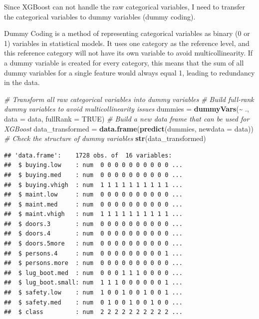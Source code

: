 \documentclass[
]{article}
\newenvironment{Shaded}{\begin{snugshade}}{\end{snugshade}}
\newcommand{\AttributeTok}[1]{\textcolor[rgb]{0.13,0.29,0.53}{#1}}
\newcommand{\CommentTok}[1]{\textcolor[rgb]{0.56,0.35,0.01}{\textit{#1}}}
\newcommand{\ConstantTok}[1]{\textcolor[rgb]{0.56,0.35,0.01}{#1}}
\newcommand{\FunctionTok}[1]{\textcolor[rgb]{0.13,0.29,0.53}{\textbf{#1}}}
\newcommand{\NormalTok}[1]{#1}
\newcommand{\OtherTok}[1]{\textcolor[rgb]{0.56,0.35,0.01}{#1}}
\newcommand{\SpecialCharTok}[1]{\textcolor[rgb]{0.81,0.36,0.00}{\textbf{#1}}}
\begin{document}
Since XGBoost can not handle the raw categorical variables, I need to
transfer the categorical variables to dummy variables (dummy coding).

Dummy Coding is a method of representing categorical variables as binary
(0 or 1) variables in statistical models. It uses one category as the
reference level, and this reference category will not have its own
variable to avoid multicollinearity. If a dummy variable is created for
every category, this means that the sum of all dummy variables for a
single feature would always equal 1, leading to redundancy in the data.

\begin{Shaded}
\begin{Highlighting}[]
\CommentTok{\# Transform all raw categorical variables into dummy variables}
\CommentTok{\# Build full{-}rank dummy variables to avoid multicollinearity issues}
\NormalTok{dummies }\OtherTok{=} \FunctionTok{dummyVars}\NormalTok{(}\SpecialCharTok{\textasciitilde{}}\NormalTok{ ., }\AttributeTok{data =}\NormalTok{ data, }\AttributeTok{fullRank =} \ConstantTok{TRUE}\NormalTok{)}
\CommentTok{\# Build a new data frame that can be used for XGBoost}
\NormalTok{data\_transformed }\OtherTok{=} \FunctionTok{data.frame}\NormalTok{(}\FunctionTok{predict}\NormalTok{(dummies, }\AttributeTok{newdata =}\NormalTok{ data))}
\CommentTok{\# Check the structure of dummy variables}
\FunctionTok{str}\NormalTok{(data\_transformed)}
\end{Highlighting}
\end{Shaded}

\begin{verbatim}
## 'data.frame':    1728 obs. of  16 variables:
##  $ buying.low    : num  0 0 0 0 0 0 0 0 0 0 ...
##  $ buying.med    : num  0 0 0 0 0 0 0 0 0 0 ...
##  $ buying.vhigh  : num  1 1 1 1 1 1 1 1 1 1 ...
##  $ maint.low     : num  0 0 0 0 0 0 0 0 0 0 ...
##  $ maint.med     : num  0 0 0 0 0 0 0 0 0 0 ...
##  $ maint.vhigh   : num  1 1 1 1 1 1 1 1 1 1 ...
##  $ doors.3       : num  0 0 0 0 0 0 0 0 0 0 ...
##  $ doors.4       : num  0 0 0 0 0 0 0 0 0 0 ...
##  $ doors.5more   : num  0 0 0 0 0 0 0 0 0 0 ...
##  $ persons.4     : num  0 0 0 0 0 0 0 0 0 1 ...
##  $ persons.more  : num  0 0 0 0 0 0 0 0 0 0 ...
##  $ lug_boot.med  : num  0 0 0 1 1 1 0 0 0 0 ...
##  $ lug_boot.small: num  1 1 1 0 0 0 0 0 0 1 ...
##  $ safety.low    : num  1 0 0 1 0 0 1 0 0 1 ...
##  $ safety.med    : num  0 1 0 0 1 0 0 1 0 0 ...
##  $ class         : num  2 2 2 2 2 2 2 2 2 2 ...
\end{verbatim}
\end{document}
